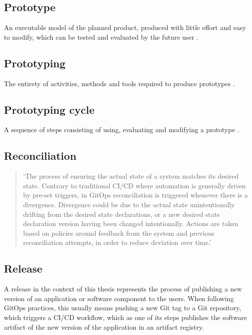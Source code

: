 \subsection*{Prototype}
An executable model of the planned product, produced with little effort and easy to modify,
which can be tested and evaluated by the future user
\autocite{riedlManagementInformatik2019}.

\subsection*{Prototyping}
The entirety of activities, methods and tools required to produce prototypes
\autocite{riedlManagementInformatik2019}.

\subsection*{Prototyping cycle}
A sequence of steps consisting of using, evaluating and modifying a prototype
\autocite{riedlManagementInformatik2019}.





\subsection*{Reconciliation}
\begin{quotation}
\noindent
\enquote*{The process of ensuring the actual state of a system matches its desired state. Contrary to traditional CI/CD where automation is generally driven by pre-set triggers, in GitOps reconciliation is triggered whenever there is a divergence. Divergence could be due to the actual state unintentionally drifting from the desired state declarations, or a new desired state declaration version having been changed intentionally. Actions are taken based on policies around feedback from the system and previous reconciliation attempts, in order to reduce deviation over time.}
\autocite{gitopsGlossary}
\end{quotation}

\subsection*{Release}

A release in the context of this thesis
represents the process of
publishing a new version of an application or software component
to the users.
When following GitOps practices,
this usually means
pushing a new Git tag to a Git repository,
which triggers a CI/CD workflow,
which as one of its steps publishes the software artifact of
the new version of the application in an artifact registry.

